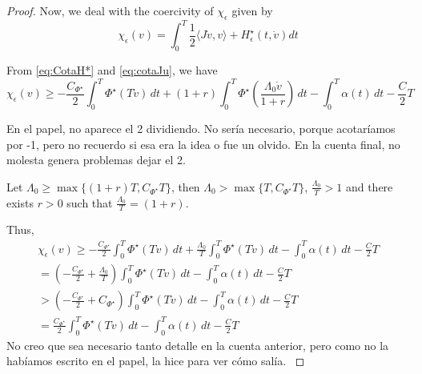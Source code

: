 \documentclass[twoside]{article}
\theoremstyle{remark}
\newcommand{\lpsi}{L^{\Phi^{\star}}}
\newcommand{\rr}{\mathbb{R}}
\renewcommand{\geq}{\geqslant}
\begin{document}
\begin{proof}
%


Now, we deal with the coercivity  of $\chi_{\epsilon}$ given by 
\begin{equation}\label{eq:DualActDelta}
\chi_{\epsilon}(v)=\int_0^T \frac{1}{2} \langle J\dot{v},v\rangle+H_{\epsilon}^{\star}(t,\dot{v})  dt
\end{equation}

From \eqref{eq:CotaH*} and \eqref{eq:cotaJu}, we have
\[
  \chi_{\epsilon}(v)\geq 
	-\frac{C_{\Phi^{\star}}}{2} \int_0^T \Phi^{\star} (T\dot{v})\,dt+(1+r)\int_0^T \Phi^{\star}
	\left(\frac{\Lambda_0 \dot{v}}{1+r}\right)\,dt-\int_0^T \alpha(t)\,dt-\frac{C}{2}T
\]

\textcolor[rgb]{1,0,0}{En el papel, no aparece el 2 dividiendo. No ser\'ia necesario, porque acotar\'iamos por -1, pero no recuerdo  
si esa era la idea o fue un olvido. En la cuenta final, no molesta genera problemas dejar el 2.
}

Let $\Lambda_0 \geq \max \{(1+r)T, C_{\Phi^{\star}}T\}$, then 
$\Lambda_0>\max\{T,C_{\Phi^{\star}}T\}$, $\frac{\Lambda_0}{T}>1$ and there exists $r>0$ such that $\frac{\Lambda_0}{T}=(1+r)$. 

Thus, 
\[
\begin{split}
  \chi_{\epsilon}(v)\geq 
	-\frac{C_{\Phi^{\star}}}{2} \int_0^T \Phi^{\star} (T\dot{v})\,dt+\frac{\Lambda_0}{T}\int_0^T \Phi^{\star}
	\left(T\dot{v}\right)\,dt-\int_0^T \alpha(t)\,dt-\frac{C}{2}T
	\\
	=	\left(-\frac{C_{\Phi^{\star}}}{2}+\frac{\Lambda_0}{T}\right) \int_0^T \Phi^{\star} (T\dot{v})\,dt
		-\int_0^T \alpha(t)\,dt-\frac{C}{2}T
		\\
		> \left(-\frac{C_{\Phi^{\star}}}{2}+C_{\Phi^{\star}}\right)\int_0^T \Phi^{\star} (T\dot{v})\,dt
		-\int_0^T \alpha(t)\,dt-\frac{C}{2}T
		\\
		=\frac{C_{\Phi^{\star}}}{2}\int_0^T \Phi^{\star} (T\dot{v})\,dt
		-\int_0^T \alpha(t)\,dt-\frac{C}{2}T
				\end{split}
\]
\textcolor[rgb]{1,0,0}{No creo que sea necesario tanto detalle en la cuenta anterior, 
pero como no la hab\'iamos escrito en el papel, la hice para ver c\'omo sal\'ia.
}
\end{proof}
\end{document}
